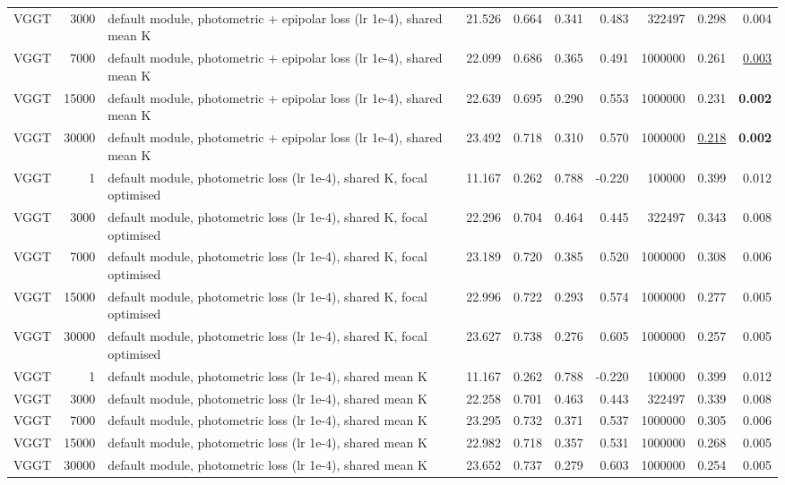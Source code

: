 \begin{table}[H]
\begin{tabular}{lrlrrrrrrr}
VGGT & 3000 & default module, photometric + epipolar loss (lr 1e-4), shared mean K & 21.526 & 0.664 & 0.341 & 0.483 & 322497 & 0.298 & 0.004 \\
VGGT & 7000 & default module, photometric + epipolar loss (lr 1e-4), shared mean K & 22.099 & 0.686 & 0.365 & 0.491 & 1000000 & 0.261 & \underline{0.003} \\
VGGT & 15000 & default module, photometric + epipolar loss (lr 1e-4), shared mean K & 22.639 & 0.695 & 0.290 & 0.553 & 1000000 & 0.231 & \textbf{0.002} \\
VGGT & 30000 & default module, photometric + epipolar loss (lr 1e-4), shared mean K & 23.492 & 0.718 & 0.310 & 0.570 & 1000000 & \underline{0.218} & \textbf{0.002} \\
VGGT & 1 & default module, photometric loss (lr 1e-4), shared K, focal optimised & 11.167 & 0.262 & 0.788 & -0.220 & 100000 & 0.399 & 0.012 \\
VGGT & 3000 & default module, photometric loss (lr 1e-4), shared K, focal optimised & 22.296 & 0.704 & 0.464 & 0.445 & 322497 & 0.343 & 0.008 \\
VGGT & 7000 & default module, photometric loss (lr 1e-4), shared K, focal optimised & 23.189 & 0.720 & 0.385 & 0.520 & 1000000 & 0.308 & 0.006 \\
VGGT & 15000 & default module, photometric loss (lr 1e-4), shared K, focal optimised & 22.996 & 0.722 & 0.293 & 0.574 & 1000000 & 0.277 & 0.005 \\
VGGT & 30000 & default module, photometric loss (lr 1e-4), shared K, focal optimised & 23.627 & 0.738 & 0.276 & 0.605 & 1000000 & 0.257 & 0.005 \\
VGGT & 1 & default module, photometric loss (lr 1e-4), shared mean K & 11.167 & 0.262 & 0.788 & -0.220 & 100000 & 0.399 & 0.012 \\
VGGT & 3000 & default module, photometric loss (lr 1e-4), shared mean K & 22.258 & 0.701 & 0.463 & 0.443 & 322497 & 0.339 & 0.008 \\
VGGT & 7000 & default module, photometric loss (lr 1e-4), shared mean K & 23.295 & 0.732 & 0.371 & 0.537 & 1000000 & 0.305 & 0.006 \\
VGGT & 15000 & default module, photometric loss (lr 1e-4), shared mean K & 22.982 & 0.718 & 0.357 & 0.531 & 1000000 & 0.268 & 0.005 \\
VGGT & 30000 & default module, photometric loss (lr 1e-4), shared mean K & 23.652 & 0.737 & 0.279 & 0.603 & 1000000 & 0.254 & 0.005 \\
\bottomrule
\end{tabular}
\end{table}
